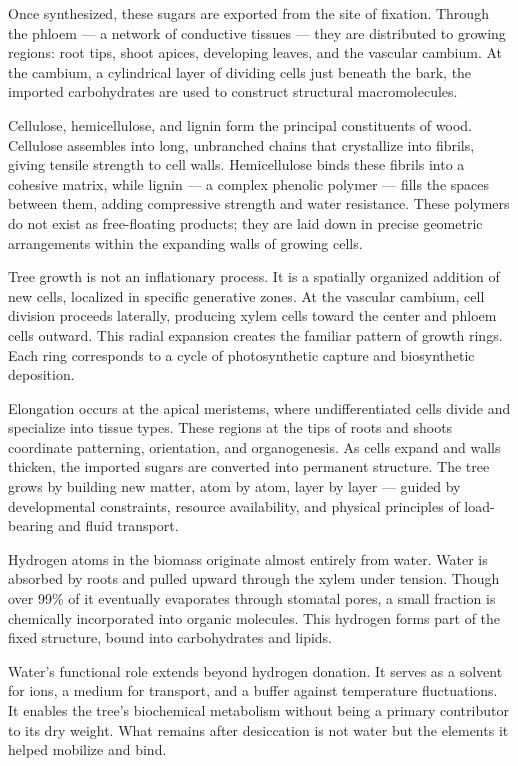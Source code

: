 Once synthesized, these sugars are exported from the site of fixation. Through the phloem — a network of conductive tissues — they are distributed to growing regions: root tips, shoot apices, developing leaves, and the vascular cambium. At the cambium, a cylindrical layer of dividing cells just beneath the bark, the imported carbohydrates are used to construct structural macromolecules.

Cellulose, hemicellulose, and lignin form the principal constituents of wood. Cellulose assembles into long, unbranched chains that crystallize into fibrils, giving tensile strength to cell walls. Hemicellulose binds these fibrils into a cohesive matrix, while lignin — a complex phenolic polymer — fills the spaces between them, adding compressive strength and water resistance. These polymers do not exist as free-floating products; they are laid down in precise geometric arrangements within the expanding walls of growing cells.

Tree growth is not an inflationary process. It is a spatially organized addition of new cells, localized in specific generative zones. At the vascular cambium, cell division proceeds laterally, producing xylem cells toward the center and phloem cells outward. This radial expansion creates the familiar pattern of growth rings. Each ring corresponds to a cycle of photosynthetic capture and biosynthetic deposition.

Elongation occurs at the apical meristems, where undifferentiated cells divide and specialize into tissue types. These regions at the tips of roots and shoots coordinate patterning, orientation, and organogenesis. As cells expand and walls thicken, the imported sugars are converted into permanent structure. The tree grows by building new matter, atom by atom, layer by layer — guided by developmental constraints, resource availability, and physical principles of load-bearing and fluid transport.

Hydrogen atoms in the biomass originate almost entirely from water. Water is absorbed by roots and pulled upward through the xylem under tension. Though over 99\% of it eventually evaporates through stomatal pores, a small fraction is chemically incorporated into organic molecules. This hydrogen forms part of the fixed structure, bound into carbohydrates and lipids.

Water's functional role extends beyond hydrogen donation. It serves as a solvent for ions, a medium for transport, and a buffer against temperature fluctuations. It enables the tree's biochemical metabolism without being a primary contributor to its dry weight. What remains after desiccation is not water but the elements it helped mobilize and bind.

